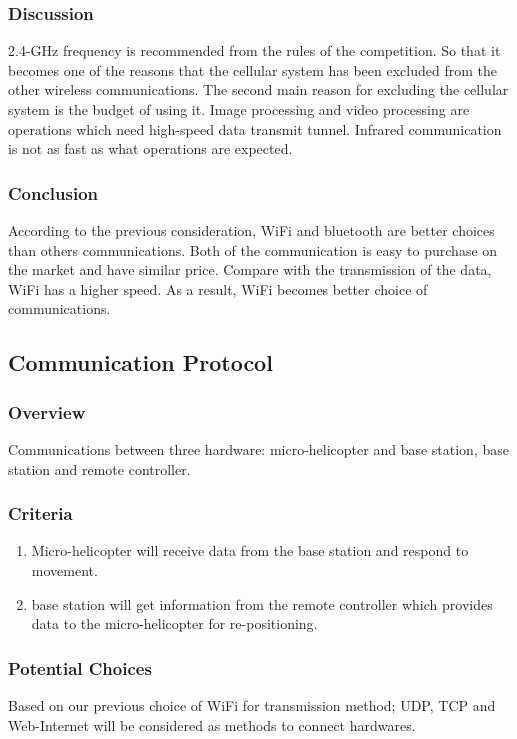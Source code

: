 \documentclass[onecolumn, draftclsnofoot,10pt, compsoc]{IEEEtran}
\begin{document}
\subsubsection{Discussion}
2.4-GHz frequency is recommended from the rules of the competition\cite{r2}. So that it becomes one of the reasons that the cellular system has been excluded from the other wireless communications. The second main reason for excluding the cellular system is the budget of using it. Image processing and video processing are operations which need high-speed data transmit tunnel. Infrared communication is not as fast as what operations are expected.

\subsubsection{Conclusion}
According to the previous consideration, WiFi and bluetooth are better choices than others communications. Both of the communication is easy to purchase on the market and have similar price. Compare with the transmission of the data, WiFi has a higher speed. As a result, WiFi becomes better choice of communications.

\subsection{Communication Protocol}

\subsubsection{Overview}
Communications between three hardware: micro-helicopter and base station, base station and remote controller.


\subsubsection{Criteria}
\begin{enumerate}
\item{Micro-helicopter will receive data from the base station and respond to movement.}
\item{base station will get information from the remote controller which provides data to the micro-helicopter for re-positioning.}
\end{enumerate}

\subsubsection{Potential Choices}
Based on our previous choice of WiFi for transmission method; UDP, TCP and Web-Internet will be considered as methods to connect hardwares.
\end{document}
